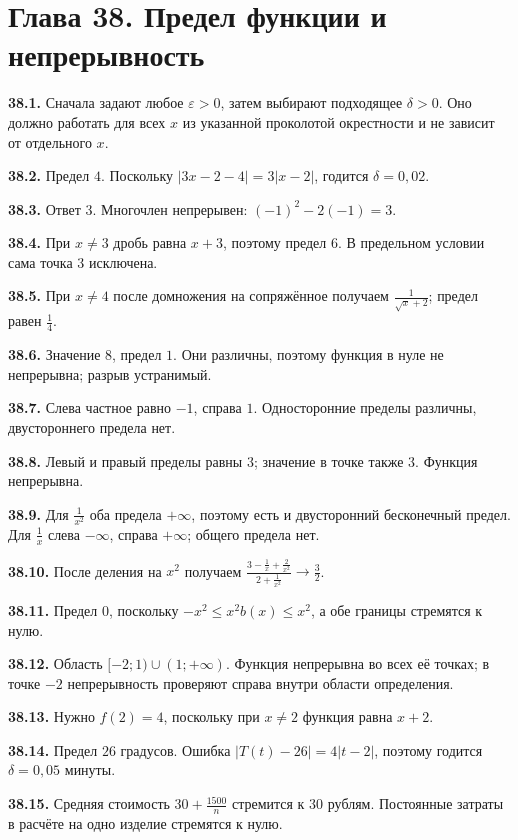 \documentclass[12pt,a4paper,oneside,openany]{book}
\theoremstyle{colordef}\newtheorem{definition}{Определение}[chapter]
\theoremstyle{plain}\newtheorem{theorem}{Теорема}[chapter]
\theoremstyle{definition}\newtheorem{axiom}{Аксиома}[chapter]
\begin{document}
\section*{Глава 38. Предел функции и непрерывность}
\begingroup\setlength{\parskip}{3pt}
\textbf{38.1.} Сначала задают любое \(\varepsilon>0\), затем выбирают подходящее \(\delta>0\). Оно должно работать для всех \(x\) из указанной проколотой окрестности и не зависит от отдельного \(x\).\par
\textbf{38.2.} Предел \(4\). Поскольку \(|3x-2-4|=3|x-2|\), годится \(\delta=0{,}02\).\par
\textbf{38.3.} Ответ \(3\). Многочлен непрерывен: \((-1)^2-2(-1)=3\).\par
\textbf{38.4.} При \(x\ne3\) дробь равна \(x+3\), поэтому предел \(6\). В предельном условии сама точка \(3\) исключена.\par
\textbf{38.5.} При \(x\ne4\) после домножения на сопряжённое получаем \(\frac1{\sqrt x+2}\); предел равен \(\frac14\).\par
\textbf{38.6.} Значение \(8\), предел \(1\). Они различны, поэтому функция в нуле не непрерывна; разрыв устранимый.\par
\textbf{38.7.} Слева частное равно \(-1\), справа \(1\). Односторонние пределы различны, двустороннего предела нет.\par
\textbf{38.8.} Левый и правый пределы равны \(3\); значение в точке также \(3\). Функция непрерывна.\par
\textbf{38.9.} Для \(\frac1{x^2}\) оба предела \(+\infty\), поэтому есть и двусторонний бесконечный предел. Для \(\frac1x\) слева \(-\infty\), справа \(+\infty\); общего предела нет.\par
\textbf{38.10.} После деления на \(x^2\) получаем \(\frac{3-\frac1x+\frac2{x^2}}{2+\frac1{x^2}}\to\frac32\).\par
\textbf{38.11.} Предел \(0\), поскольку \(-x^2\le x^2b(x)\le x^2\), а обе границы стремятся к нулю.\par
\textbf{38.12.} Область \([-2;1)\cup(1;+\infty)\). Функция непрерывна во всех её точках; в точке \(-2\) непрерывность проверяют справа внутри области определения.\par
\textbf{38.13.} Нужно \(f(2)=4\), поскольку при \(x\ne2\) функция равна \(x+2\).\par
\textbf{38.14.} Предел \(26\) градусов. Ошибка \(|T(t)-26|=4|t-2|\), поэтому годится \(\delta=0{,}05\) минуты.\par
\textbf{38.15.} Средняя стоимость \(30+\frac{1500}{n}\) стремится к \(30\) рублям. Постоянные затраты в расчёте на одно изделие стремятся к нулю.\par
\end{document}
